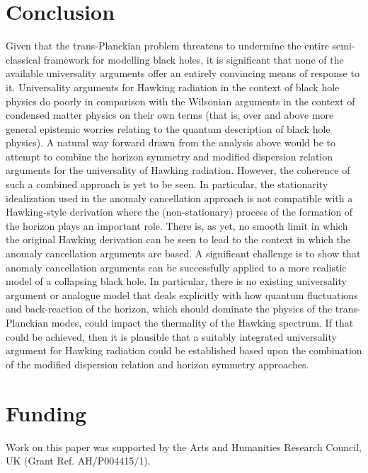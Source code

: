 \documentclass[12pt,english]{article}
\numberwithin{equation}{section}
\begin{document}
 

\section{Conclusion}
\label{sec:comparison_hawking_vs_wilson_universality}


Given that the trans-Planckian problem threatens to undermine the entire semi-classical framework for modelling black holes, it is significant that none of the available universality arguments offer an entirely convincing means of response to it. Universality arguments for Hawking radiation in the context of black hole physics do poorly in comparison with the Wilsonian arguments in the context of condensed matter physics on their own terms (that is, over and above more general epistemic worries relating to the quantum description of black hole physics).  A natural way forward drawn from the analysis above would be to attempt to combine the horizon symmetry and modified dispersion relation arguments for the universality of Hawking radiation. However, the coherence of such a combined approach is yet to be seen. In particular, the stationarity idealization used in the anomaly cancellation approach is not compatible with a Hawking-style derivation where the (non-stationary) process of the formation of the horizon plays an important role. There is, as yet, no smooth limit in which the original Hawking derivation can be seen to lead to the context in which the anomaly cancellation arguments are based. A significant challenge is to show that  anomaly cancellation arguments can be successfully applied to a more realistic model of a collapsing black hole. In particular, there is no existing universality argument or analogue model that deals explicitly with how quantum fluctuations and back-reaction of the horizon, which should dominate the physics of the trans-Planckian modes, could impact the thermality of the Hawking spectrum. If that could be achieved, then it is plausible that a suitably integrated universality argument for Hawking radiation could be established based upon the combination of the modified dispersion relation and horizon symmetry approaches.  


\section*{Funding}

Work on this paper was supported by the Arts and Humanities Research Council, UK (Grant Ref. AH/P004415/1).
\end{document}
